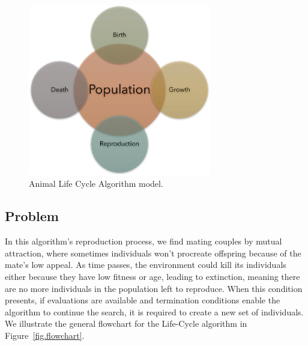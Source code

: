 \documentclass[graybox]{svmult}
\begin{document}
        \begin{figure}
            \centering
            \includegraphics[width=80mm]{img/fig_algorithm_model.pdf}
            \caption{Animal Life Cycle Algorithm model.} \label{fig.algorithm_model}
            \end{figure}

    \subsection{Problem}

        In this algorithm's reproduction process, we find mating couples by mutual
        attraction, where sometimes individuals won't procreate offspring because of
        the mate's low appeal. As time passes, the environment could kill its
        individuals either because they have low fitness or age, leading to extinction,
        meaning there are no more individuals in the population left to reproduce. When
        this condition presents, if evaluations are available and termination
        conditions enable the algorithm to continue the search, it is required to
        create a new set of individuals. We illustrate the general flowchart for the
        Life-Cycle algorithm in Figure~\ref{fig.flowchart}.
        
\end{document}

